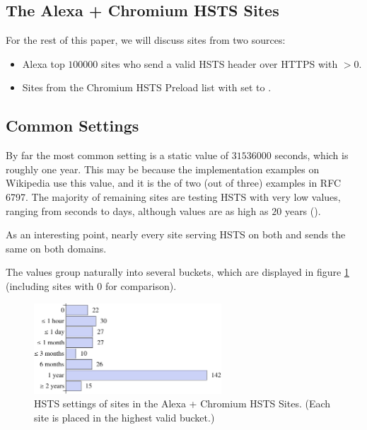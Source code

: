 \documentclass{acm_proc_article-sp}
\begin{document}
{\subsection{The Alexa + Chromium HSTS Sites}

For the rest of this paper, we will discuss sites from two sources:

\begin{itemize}
\item Alexa top $100000$ sites who send a valid HSTS header over HTTPS with {\ma}$ > 0$.
\item Sites from the Chromium HSTS Preload list with  set to .
\end{itemize}


\subsection{Common  Settings}

By far the most common {\ma} setting is a static value of $31536000$ seconds, which is roughly one year. This may be because the implementation examples on Wikipedia use this value\cite{wiki}, and it is the {\ma} of two (out of three) examples in RFC 6797\cite{rfc}. The majority of remaining sites are testing HSTS with very low values, ranging from seconds to days, although {\ma} values are as high as $20$ years ().

As an interesting point, nearly every site serving HSTS on both {\s} and {\sw} sends the same {\ma} on both domains.

The {\ma} values group naturally into several buckets, which are displayed in figure \ref{fig:max-age} (including sites with {\ma} $0$ for comparison).

\begin{figure}[h!]
\begin{center}
\includegraphics[width=70mm]{max-age.pdf}
\caption{HSTS  settings of sites in the Alexa + Chromium HSTS Sites. (Each site is placed in the highest valid bucket.)}
\label{fig:max-age}
\end{center}
\end{figure}
 

}
\end{document}
